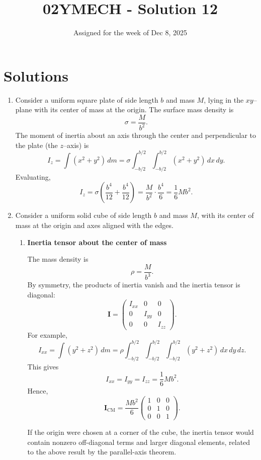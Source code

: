 \documentclass[12pt]{article}
\title{02YMECH - Solution 12}
\date{Assigned for the week of Dec 8, 2025}
\author{}
\begin{document}
\maketitle

\section*{Solutions}

\begin{enumerate}

\item Consider a uniform square plate of side length $b$ and mass $M$, lying in the $xy$--plane with its center of mass at the origin.  
The surface mass density is
\[
\sigma=\frac{M}{b^2}.
\]
The moment of inertia about an axis through the center and perpendicular to the plate (the $z$--axis) is
\[
I_z=\int (x^2+y^2)\,dm
=\sigma\int_{-b/2}^{b/2}\int_{-b/2}^{b/2}(x^2+y^2)\,dx\,dy.
\]
Evaluating,
\[
I_z=\sigma\left(\frac{b^4}{12}+\frac{b^4}{12}\right)
=\frac{M}{b^2}\cdot\frac{b^4}{6}
=\frac{1}{6}Mb^2.
\]


\item Consider a uniform solid cube of side length $b$ and mass $M$, with its center of mass at the origin and axes aligned with the edges.

\begin{enumerate}

\item \textbf{Inertia tensor about the center of mass}

The mass density is
\[
\rho=\frac{M}{b^3}.
\]
By symmetry, the products of inertia vanish and the inertia tensor is diagonal:
\[
\mathbf I=
\begin{pmatrix}
I_{xx} & 0 & 0\\
0 & I_{yy} & 0\\
0 & 0 & I_{zz}
\end{pmatrix}.
\]
For example,
\[
I_{xx}=\int (y^2+z^2)\,dm
=\rho\int_{-b/2}^{b/2}\!\!\int_{-b/2}^{b/2}\!\!\int_{-b/2}^{b/2}(y^2+z^2)\,dx\,dy\,dz.
\]
This gives
\[
I_{xx}=I_{yy}=I_{zz}=\frac{1}{6}Mb^2.
\]
Hence,
\[
\mathbf I_{\text{CM}}=\frac{Mb^2}{6}
\begin{pmatrix}
1&0&0\\
0&1&0\\
0&0&1
\end{pmatrix}.
\]

If the origin were chosen at a corner of the cube, the inertia tensor would contain nonzero off-diagonal terms and larger diagonal elements, related to the above result by the parallel-axis theorem.


\end{enumerate}
\end{enumerate}
\end{document}

